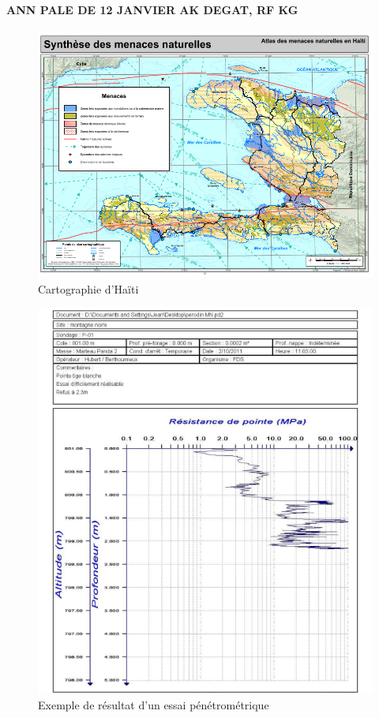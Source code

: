 \paragraph{ANN PALE DE 12 JANVIER AK DEGAT, RF KG}

\begin{figure}
    \centering
    \includegraphics[width=1\textwidth]{images/Contexte/haiti.png}
    \caption{Cartographie d'Haïti}
    \label{fig:haiti}
\end{figure}

\begin{figure}
    \centering
    \includegraphics[width=1\textwidth]{images/Contexte/penetrographe.png}
    \caption{Exemple de résultat d'un essai pénétrométrique}
    \label{fig:test_penetrometrique}
\end{figure}
